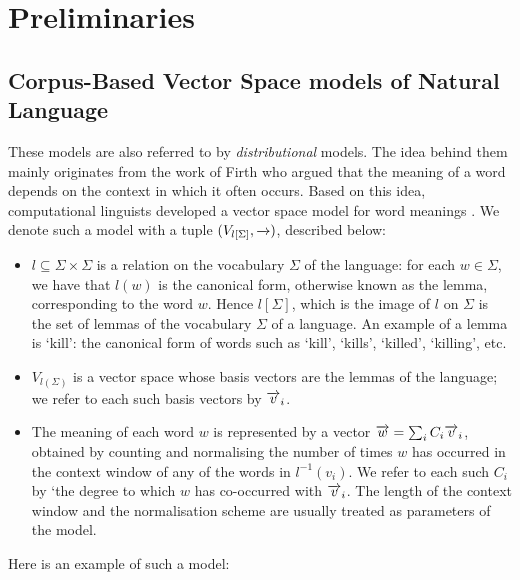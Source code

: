 
\section{Preliminaries}
\label{prelim}

\subsection{Corpus-Based Vector Space models of Natural Language}
\label{DistVect}

These models are also referred to by \emph{distributional} models. The idea behind them mainly originates from the work of  Firth \cite{Firth} who argued that the meaning of a word depends on the context in which it often occurs. Based on this idea, computational linguists developed a vector space model for word meanings \cite{???}. We denote such a model with a tuple  $(V_{l[\Sigma]}, \overrightarrow{\text{\ }})$, described below:
\begin{itemize}
\item $l\subseteq \Sigma \times \Sigma$ is a relation on the vocabulary $\Sigma$ of the language: for each $w \in \Sigma$, we have that $l(w)$ is the canonical form, otherwise known as the lemma, corresponding to the word $w$.   Hence $l[\Sigma]$, which is the image of $l$ on $\Sigma$ is the set of lemmas of the vocabulary $\Sigma$ of a  language.  An example of a lemma is `kill':  the canonical form of  words such as `kill', `kills', `killed', `killing',  etc. 
\item $V_{l(\Sigma)}$ is a vector space whose basis vectors are the lemmas of the language; we refer to each such basis vectors  by $\overrightarrow{v}_i$. 
\item The meaning of each word $w$ is represented by a vector $\overrightarrow{w} = \sum_i C_i \overrightarrow{v}_i$, obtained by counting and normalising the number of times $w$ has occurred in the context window of any of the  words in $l^{-1}({v}_i)$.   We refer to each such $C_i$ by `the degree to which $w$ has co-occurred with $\overrightarrow{v}_i$. The length of the context window and the normalisation scheme are usually treated as parameters of the model.
\end{itemize}

Here is an example of such a model:

